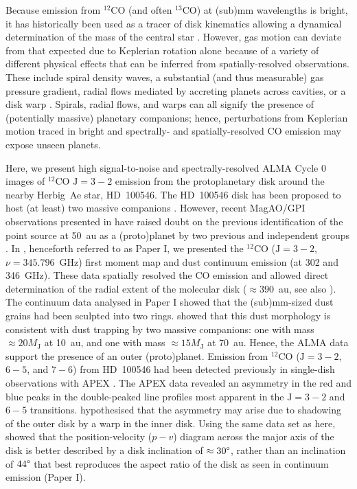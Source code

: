 \documentclass[onecolumn]{aastex6}
\begin{document}
Because emission from $^{12}$CO (and often $^{13}$CO) at (sub)mm wavelengths 
is bright, it has historically been used as a tracer of disk kinematics allowing 
a dynamical determination of the mass of the central star \citep[e.g.,][]{simon00}.  
However, gas motion can deviate from that expected due to 
Keplerian rotation alone because of a variety of different physical effects 
that can be inferred from spatially-resolved observations. 
These include spiral density waves, a substantial (and thus measurable) 
gas pressure gradient, radial flows mediated by accreting planets 
across cavities, or a disk warp 
\citep[see, e.g.,][]{rosenfeld12,tang12,casassus13,rosenfeld14,christiaens14,casassus15}.  
Spirals, radial flows, and warps can all signify the presence 
of (potentially massive) planetary companions; 
hence, perturbations from Keplerian motion traced in 
bright and spectrally- and spatially-resolved CO emission 
may expose unseen planets.  

Here, we present high signal-to-noise and spectrally-resolved 
ALMA Cycle 0 images of $^{12}$CO $\mathrm{J}=3-2$ emission from the protoplanetary 
disk around the nearby Herbig~Ae star, HD~100546.  
The HD~100546 disk has been proposed to host (at least) two 
massive companions \citep[see, e.g.,][]{acke06,quanz13,walsh14}. 
However, recent MagAO/GPI observations presented in \citet{rameau17} 
have raised doubt on the previous identification of the point source at 50~au 
as a (proto)planet by two previous and independent groups \citep{currie15,quanz15}.
In \citet{walsh14}, henceforth referred to as Paper I, 
we presented the $^{12}$CO ($\mathrm{J}=3-2$, $\nu=345.796$~GHz) first moment map 
and dust continuum emission (at 302 and 346~GHz).  
These data spatially resolved the CO emission and allowed direct 
determination of the radial extent of the molecular disk ($\approx 390$~au, 
see also \citealt{pineda14}). 
The continuum data analysed in Paper I showed that the (sub)mm-sized dust grains 
had been sculpted into two rings. 
\citet{pinilla15} showed that this 
dust morphology is consistent with dust trapping by two massive companions: 
one with mass $\approx 20 M_\mathrm{J}$ at 10~au, and one with mass 
$\approx 15 M_\mathrm{J}$ at 70~au.  
Hence, the ALMA data support the presence of an outer (proto)planet. 
Emission from $^{12}$CO ($\mathrm{J}=3-2$, $6-5$, and $7-6$) from HD~100546 
had been detected previously in single-dish observations with APEX \citep{panic10}.    
The APEX data revealed an asymmetry in the red and blue peaks 
in the double-peaked line profiles most apparent in the $\mathrm{J}=3-2$ 
and $6-5$ transitions. 
\citet{panic10} hypothesised that the asymmetry may arise 
due to shadowing of the outer disk by a warp in the inner disk.  
Using the same data set as here, \citet{pineda14} showed that the 
position-velocity ($p-v$) diagram across the major axis of the disk is 
better described by a disk inclination of $\approx 30\degree$, 
rather than an inclination of $44\degree$ that best reproduces the 
aspect ratio of the disk as seen in continuum emission (Paper I).  
\end{document}
